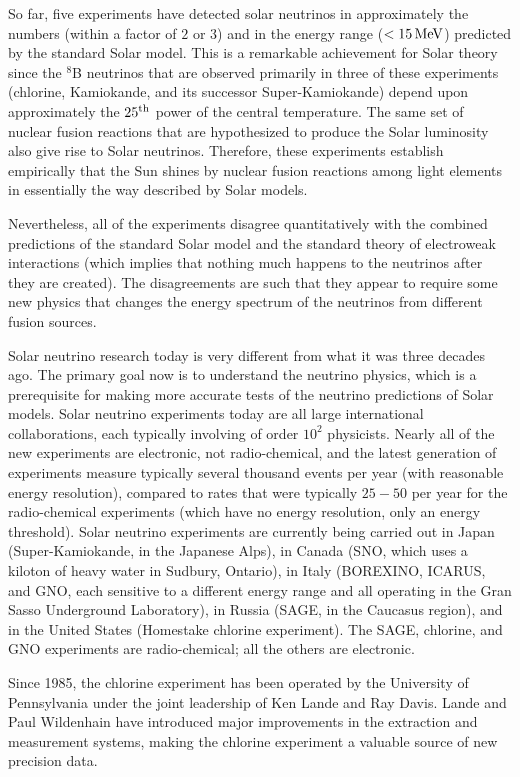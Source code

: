 \documentclass[a4paper,10pt]{article}
\begin{document}
{\noindent}So far, five experiments have detected solar neutrinos in approximately the numbers (within a factor of $2$ or $3$) and in the energy range ($<15\,{\rm MeV}$) predicted by the standard Solar model. This is a remarkable achievement for Solar theory since the $^8$B neutrinos that are observed primarily in three of these experiments (chlorine, Kamiokande, and its successor Super-Kamiokande) depend upon approximately the $25^{\rm th}$ power of the central temperature. The same set of nuclear fusion reactions that are hypothesized to produce the Solar luminosity also give rise to Solar neutrinos. Therefore, these experiments establish empirically that the Sun shines by nuclear fusion reactions among light elements in essentially the way described by Solar models.

{\noindent}Nevertheless, all of the experiments disagree quantitatively with the combined predictions of the standard Solar model and the standard theory of electroweak interactions (which implies that nothing much happens to the neutrinos after they are created). The disagreements are such that they appear to require some new physics that changes the energy spectrum of the neutrinos from different fusion sources.

{\noindent}Solar neutrino research today is very different from what it was three decades ago. The primary goal now is to understand the neutrino physics, which is a prerequisite for making more accurate tests of the neutrino predictions of Solar models. Solar neutrino experiments today are all large international collaborations, each typically involving of order $10^2$ physicists. Nearly all of the new experiments are electronic, not radio-chemical, and the latest generation of experiments measure typically several thousand events per year (with reasonable energy resolution), compared to rates that were typically $25-50$ per year for the radio-chemical experiments (which have no energy resolution, only an energy threshold). Solar neutrino experiments are currently being carried out in Japan (Super-Kamiokande, in the Japanese Alps), in Canada (SNO, which uses a kiloton of heavy water in Sudbury, Ontario), in Italy (BOREXINO, ICARUS, and GNO, each sensitive to a different energy range and all operating in the Gran Sasso Underground Laboratory), in Russia (SAGE, in the Caucasus region), and in the United States (Homestake chlorine experiment). The SAGE, chlorine, and GNO experiments are radio-chemical; all the others are electronic.

{\noindent}Since 1985, the chlorine experiment has been operated by the University of Pennsylvania under the joint leadership of Ken Lande and Ray Davis. Lande and Paul Wildenhain have introduced major improvements in the extraction and measurement systems, making the chlorine experiment a valuable source of new precision data. 
\end{document}
